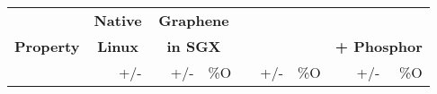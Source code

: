 \begin{table}[t!b!]
	\footnotesize
	\centering
	\tabcolsep=0.09cm
	\begin{tabular}{|l|rr|rrr|rrr|rrr|}
		\hline
		{} & \multicolumn{2}{|c|}{{\bf Native}} &  \multicolumn{3}{|c|}{{\bf Graphene
			}} &
			\multicolumn{3}{|c|}{{\bf 
				}} &
				\multicolumn{3}{|c|}{{\bf \systemname{}
					}} \\
		{\bf Property } & \multicolumn{2}{|c|}{{\bf Linux}} &  \multicolumn{3}{|c|}{{\bf in SGX
			}} &
			\multicolumn{3}{|c|}{{\bf \systemname{}
				}} &
				\multicolumn{3}{|c|}{{\bf + Phosphor
					}} \\
				
				&  & {\footnotesize +/-} &  & {\footnotesize +/-} & \%O&  &  {\footnotesize +/-} & \%O&  & {\footnotesize +/-} & \%O\\

				

\end{tabular}
\end{table}
